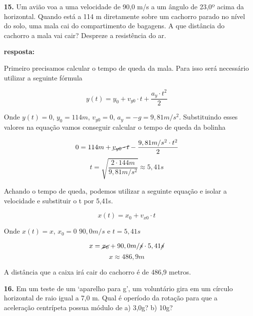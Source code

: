 \documentclass[a4paper, 12pt]{article}
\begin{document}
\begin{flushleft}
		\vspace{2em}
		
		\textbf{15.} Um avião voa a uma velocidade de 90,0 m/s a um ângulo de 23,0º acima da horizontal. Quando está a 114 m diretamente sobre um cachorro parado no nível do solo, uma mala cai do compartimento de bagagens. A que distância do cachorro a mala vai cair? Despreze a resistência do ar.
		
		\textbf{resposta:}
		
		Primeiro precisamos calcular  o tempo de queda da mala. Para isso será necessário utilizar a seguinte fórmula
		
		\begin{equation*}
			y(t) = y_0 + v_{y0} \cdot t + \frac{a_y \cdot t^2}{2}
		\end{equation*}
		
		Onde $y(t) = 0$, $y_0 = 114m$, $v_{y0} = 0$, $a_y = -g = 9,81 m/s^2$. Substituindo esses valores na equação vamos conseguir calcular o tempo de queda da bolinha
		
		\begin{equation*}
			0 = 114m + \cancel{v_{y0} \cdot t} - \frac{9,81m/s^2 \cdot t^2}{2}
		\end{equation*}
		\begin{equation*}
			t = \sqrt{\frac{2 \cdot 144m}{9,81 m/s^2}} \approx 5,41s
		\end{equation*}
		
		Achando o tempo de queda, podemos utilizar a seguinte equação e isolar a velocidade e substituir o t por 5,41s.
		
		\begin{equation*}
			x(t) = x_0 + v_{x0} \cdot t
		\end{equation*}
		
		Onde $x(t) = x$, $x_0=0$ $90,0m/s$ e $t=5,41s$ 
		
		\begin{equation*}
			x = \cancel{x_0} + 90,0m/\cancel{s} \cdot 5,41\cancel{s}
		\end{equation*}
		\begin{equation*}
			x \approx 486,9 m
		\end{equation*}
		
		A distância que a caixa irá cair do cachorro é de 486,9 metros.
		
		\vspace{2em}
		
		\textbf{16.} Em um teste de um ‘aparelho para g’, um voluntário gira em um círculo horizontal de raio igual a 7,0 m. Qual é operíodo da rotação para que a aceleração centrípeta possua módulo de a) 3,0g? b) 10g?
		

\end{flushleft}
\end{document}
